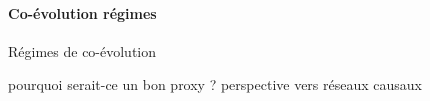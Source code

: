 




\paragraph{Co-évolution régimes}{Régimes de co-évolution}



pourquoi serait-ce un bon proxy ? perspective vers réseaux causaux
\cite{seth2005causal}
\cite{castellacci2013dynamics}







